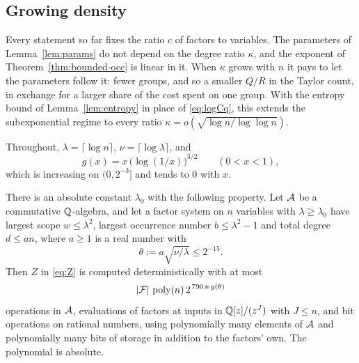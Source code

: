 \subsection{Growing density}\label{ssec:density}
Every statement so far fixes the ratio $c$ of factors to variables. The
parameters of Lemma~\ref{lem:params} do not depend on the degree ratio
$\kappa$, and the exponent of Theorem~\ref{thm:bounded-occ} is linear in it.
When $\kappa$ grows with $n$ it pays to let the parameters follow it: fewer
groups, and so a smaller $Q/R$ in the Taylor count, in exchange for a larger
share of the cost spent on one group. With the entropy bound of
Lemma~\ref{lem:entropy} in place of \eqref{eq:logCq}, this extends the
subexponential regime to every ratio $\kappa=o(\sqrt{\log n/\log\log n})$.

Throughout, $\lambda=\lceil\log n\rceil$, $\nu=\lceil\log\lambda\rceil$, and
\[
  g(x)=x\,\bigl(\log(1/x)\bigr)^{3/2}\qquad(0<x<1),
\]
which is increasing on $(0,2^{-3}]$ and tends to $0$ with $x$.

\begin{theorem}\label{thm:explicit}
There is an absolute constant $\lambda_0$ with the following property. Let $\mathcal{A}$
be a commutative $\mathbb{Q}$-algebra, and let a factor system on $n$ variables with
$\lambda\ge\lambda_0$ have largest scope $w\le\lambda^2$, largest occurrence
number $b\le\lambda^2-1$ and total degree $d\le an$, where $a\ge1$ is a
real number with
\[
  \theta:=a\sqrt{\nu/\lambda}\le2^{-15}.
\]
Then $Z$ in \eqref{eq:Z} is computed deterministically with at most
\begin{equation}\label{eq:explicit}
  |\mathcal{F}|\,\operatorname{poly}(n)\,2^{\,790\,n\,g(\theta)}
\end{equation}
operations in $\mathcal{A}$, evaluations of factors at inputs in $\mathbb{Q}[z]/(z^{J})$ with
$J\le n$, and bit operations on rational numbers, using polynomially many
elements of $\mathcal{A}$ and polynomially many bits of storage in addition to the
factors' own. The polynomial is absolute.
\end{theorem}

